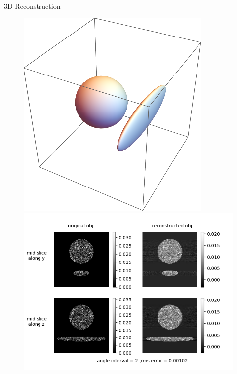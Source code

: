 \documentclass[slidestop,compress,12pt]{beamer}
\begin{document}
\section[3D Reconstruction]{}
\begin{frame}{3D Reconstruction}
    \begin{figure}
    \centering
        \begin{minipage}{0.2\textwidth}
            \includegraphics[width=1\linewidth]{imgs/obj.png}
        \end{minipage}%
        \begin{minipage}{0.8\textwidth}
            \includegraphics[width=1\linewidth]{imgs/mid_slices.png}
        \end{minipage}
    \end{figure}
\end{frame}
\end{document}
